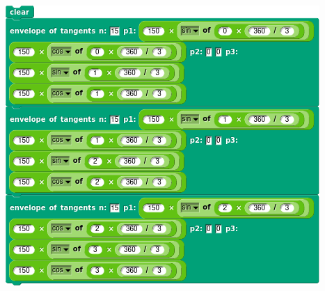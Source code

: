 \documentclass[noauthor,nooutcomes,12pt,hints]{ximera}
\begin{document}
\begin{question}
\begin{freeResponse}
\begin{center}
    \includegraphics[width=.3\textwidth]{triEnvScript.png}\qquad{}
  \end{center}
  \end{freeResponse}
\end{question}

\mynewpage
\end{document}
